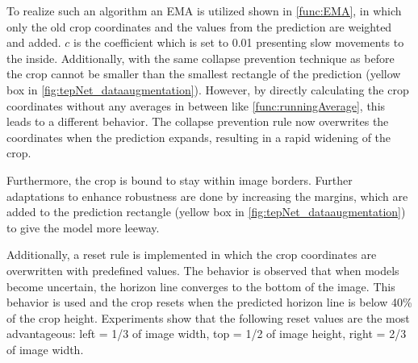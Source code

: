 To realize such an algorithm an \ac{EMA} is utilized shown in \autoref{func:EMA}, in which only the old crop coordinates and the values from the prediction are weighted and added.
$c$ is the coefficient which is set to 0.01 presenting slow movements to the inside.
Additionally, with the same collapse prevention technique as before the crop cannot be smaller than the smallest rectangle of the prediction (yellow box in \autoref{fig:tepNet_dataaugmentation}).
However, by directly calculating the crop coordinates without any averages in between like \autoref{func:runningAverage}, this leads to a different behavior.
The collapse prevention rule now overwrites the coordinates when the prediction expands, resulting in a rapid widening of the crop.

Furthermore, the crop is bound to stay within image borders.
Further adaptations to enhance robustness are done by increasing the margins, which are added to the prediction rectangle (yellow box in \autoref{fig:tepNet_dataaugmentation}) to give the model more leeway.

Additionally, a reset rule is implemented in which the crop coordinates are overwritten with predefined values.
The behavior is observed that when models become uncertain, the horizon line converges to the bottom of the image.
This behavior is used and the crop resets when the predicted horizon line is below 40\% of the crop height.
Experiments show that the following reset values are the most advantageous: left = 1/3 of image width, top = 1/2 of image height, right = 2/3 of image width.

